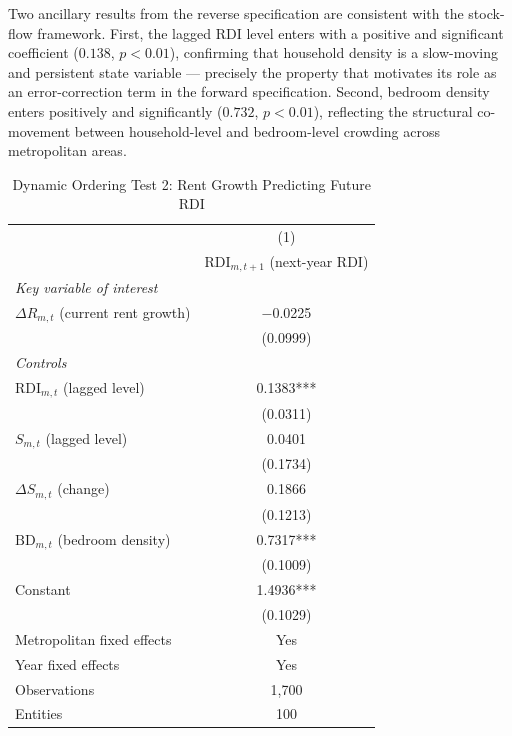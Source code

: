\documentclass[pdflatex,sn-basic]{sn-jnl}%
\theoremstyle{thmstyleone}%
\theoremstyle{thmstyletwo}%
\theoremstyle{thmstylethree}%
\begin{document}
Two ancillary results from the reverse specification are consistent with the 
stock-flow framework. First, the lagged RDI level enters with a positive and 
significant coefficient ($0.138$, $p < 0.01$), confirming that household 
density is a slow-moving and persistent state variable --- precisely the 
property that motivates its role as an error-correction term in the forward 
specification. Second, bedroom density enters positively and significantly 
($0.732$, $p < 0.01$), reflecting the structural co-movement between 
household-level and bedroom-level crowding across metropolitan areas.

\begin{table}[htbp]
\centering
\caption{Dynamic Ordering Test 2: Rent Growth Predicting Future RDI}
\label{tab:dynamic_rev}
\begin{tabular}{lc}
\toprule
 & (1) \\
 & $\text{RDI}_{m,t+1}$ (next-year RDI) \\
\midrule
\textit{Key variable of interest} & \\
$\Delta R_{m,t}$ (current rent growth) & $-$0.0225 \\
                                        & (0.0999)  \\
\addlinespace
\textit{Controls} & \\
$\text{RDI}_{m,t}$ (lagged level)      & 0.1383*** \\
                                        & (0.0311)  \\
$S_{m,t}$ (lagged level)               & 0.0401 \\
                                        & (0.1734)  \\
$\Delta S_{m,t}$ (change)              & 0.1866 \\
                                        & (0.1213)  \\
$\text{BD}_{m,t}$ (bedroom density)    & 0.7317*** \\
                                        & (0.1009)  \\
\addlinespace
Constant                                & 1.4936*** \\
                                        & (0.1029)  \\
\midrule
Metropolitan fixed effects              & Yes \\
Year fixed effects                      & Yes \\
Observations                            & 1,700 \\
Entities                                & 100 \\

\end{tabular}
\end{table}
\end{document}
